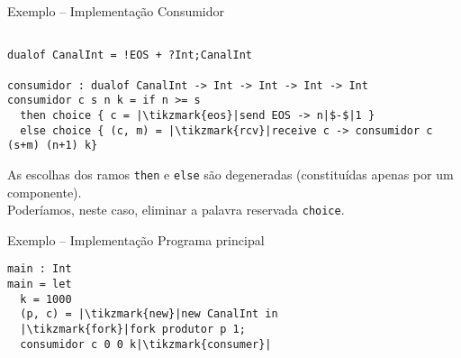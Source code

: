 \begin{frame}[fragile]{Exemplo -- Implementação  \hfill \color{mLightBrown}Consumidor}
  \begin{lstlisting}[xleftmargin=-.04\textwidth]

dualof CanalInt = !EOS + ?Int;CanalInt
    
consumidor : dualof CanalInt -> Int -> Int -> Int -> Int
consumidor c s n k = if n >= s
  then choice { c = |\tikzmark{eos}|send EOS -> n|$-$|1 }
  else choice { (c, m) = |\tikzmark{rcv}|receive c -> consumidor c (s+m) (n+1) k}
\end{lstlisting}


 
\begin{tcolorbox}
  As escolhas dos ramos \lstinline|then| e \lstinline|else| são degeneradas (constituídas apenas por um componente).\\
  Poderíamos, neste caso, eliminar a palavra reservada \lstinline|choice|.
\end{tcolorbox}

\end{frame}

\begin{frame}[fragile]{Exemplo -- Implementação  \hfill \color{mLightBrown}Programa principal}
  \begin{lstlisting}[xleftmargin=.2\textwidth, xrightmargin=.15\textwidth]
main : Int
main = let
  k = 1000
  (p, c) = |\tikzmark{new}|new CanalInt in
  |\tikzmark{fork}|fork produtor p 1;
  consumidor c 0 0 k|\tikzmark{consumer}|
\end{lstlisting}



\end{frame}


 